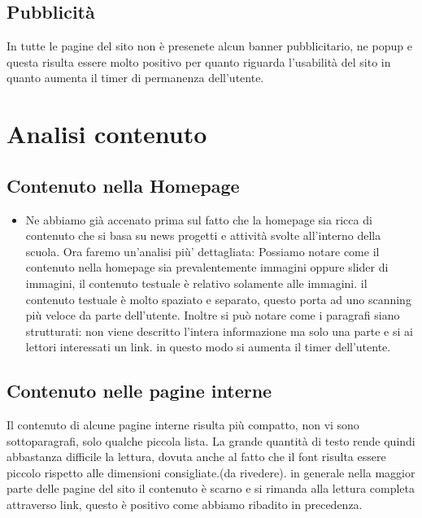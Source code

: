 \documentclass[12pt]{article}
\begin{document}
\subsection{Pubblicit\`a}
In tutte le pagine del sito non \`e presenete alcun banner pubblicitario, ne popup e questa risulta essere molto positivo per quanto riguarda l'usabilit\`a del sito in quanto aumenta il timer di permanenza dell'utente.

\newpage
\section{Analisi contenuto}
\subsection{Contenuto nella Homepage}
\begin{itemize}
	\item Ne abbiamo gi\`a accenato prima sul fatto che la homepage sia ricca di contenuto che si basa su news progetti e attivit\`a svolte all'interno della scuola. Ora faremo un'analisi pi\`u' dettagliata:
	Possiamo notare come il contenuto nella homepage sia prevalentemente immagini oppure slider di immagini, il contenuto testuale \`e relativo solamente alle immagini. il contenuto testuale \`e  molto spaziato e separato, questo porta ad uno scanning pi\`u  veloce da parte dell'utente. Inoltre si pu\`o  notare come i paragrafi siano strutturati:
	non viene descritto l'intera informazione ma solo una parte e si ai lettori interessati un link. in questo modo si aumenta il timer dell'utente.	 
\end{itemize}
\subsection{Contenuto nelle pagine interne}

	  Il contenuto di alcune pagine interne risulta pi\`u compatto, non vi sono sottoparagrafi, solo qualche piccola lista. La grande quantit\`a di testo rende quindi abbastanza difficile la lettura, dovuta anche al fatto che il font risulta essere piccolo rispetto alle dimensioni consigliate.(da rivedere).
	in generale nella maggior parte delle pagine del sito il contenuto \`e scarno e si rimanda alla lettura completa attraverso link, questo \`e positivo come abbiamo ribadito in precedenza.
\end{document}
